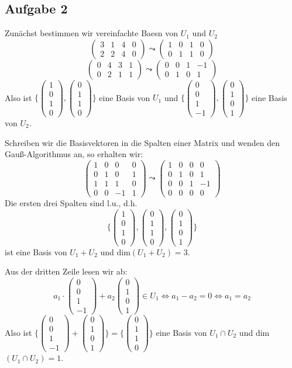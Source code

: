 \documentclass[a4paper,twoside,DIV15,BCOR12mm]{scrbook}
\newcommand{\LRA}{\Leftrightarrow}
\newcommand{\x}{\cdot}
\newcommand{\vect}{\begin{pmatrix}}
\newcommand{\tcev}{\end{pmatrix}}
\providecommand{\matr}[1]{\begin{pmatrix}#1\end{pmatrix}}
\begin{document}
\subsection {Aufgabe 2}
Zunächst bestimmen wir vereinfachte Baesn von $U_1$ und $U_2$
\[\matr{3&1&4&0\\2&2&4&0}\leadsto\matr{1&0&1&0\\0&1&1&0}\]
\[\matr{0&4&3&1\\0&2&1&1}\leadsto\matr{0&0&1&-1\\0&1&0&1}\]
Also ist $\{\vect 1\\0\\1\\0\tcev, \vect 0\\1\\1\\0\tcev\}$ eine Basis von $U_1$ und $\{\vect 0\\0\\1\\-1\tcev, \vect 0\\1\\0\\1\tcev\}$ eine Basis von $U_2$.\par
Schreiben wir die Basisvektoren in die Spalten einer Matrix und wenden den Gauß-Algorithmus an, so erhalten wir:
\[\matr{1&0&0&0\\0&1&0&1\\1&1&1&0\\0&0&-1&1}\leadsto\matr{1&0&0&0\\0&1&0&1\\0&0&1&-1\\0&0&0&0}\]
Die ersten drei Spalten sind l.u., d.h.
\[\{\vect 1\\0\\1\\0\tcev, \vect 0\\1\\1\\0\tcev, \vect 0\\1\\0\\1\tcev\}\]
ist eine Basis von $U_1+U_2$ und dim$(U_1+U_2)=3$.\par
Aus der dritten Zeile lesen wir ab:
\[a_1\x\vect0\\0\\1\\-1\tcev+a_2\vect0\\1\\0\\1\tcev\in U_1\LRA a_1-a_2=0\LRA a_1=a_2\]
Also ist $\{\vect0\\0\\1\\-1\tcev+\vect0\\1\\0\\1\tcev\}=\{\vect0\\1\\1\\0\tcev\}$ eine Basis von $U_1\cap U_2$ und dim$(U_1\cap U_2)=1$.
\end{document}

